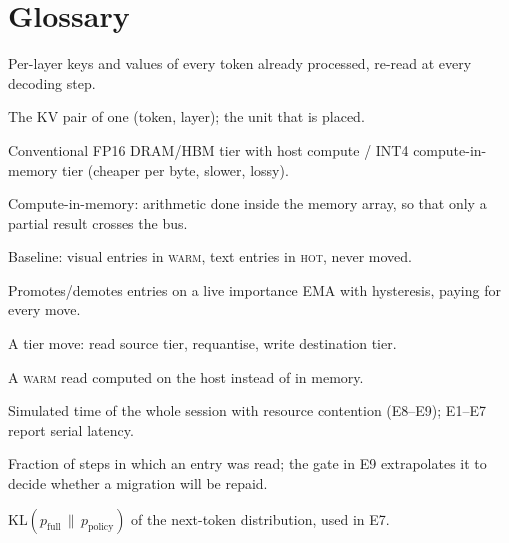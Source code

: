 \documentclass[10pt,a4paper]{article}
\newcommand{\hot}{\textsc{hot}}
\newcommand{\warm}{\textsc{warm}}
\begin{document}
\section{Glossary}
\begin{description}[leftmargin=2.2cm,labelwidth=2cm,itemsep=1pt]
\item[KV cache] Per-layer keys and values of every token already processed, re-read at every decoding step.
\item[Entry] The KV pair of one (token, layer); the unit that is placed.
\item[\hot{} / \warm{}] Conventional FP16 DRAM/HBM tier with host compute / INT4 compute-in-memory tier (cheaper per byte, slower, lossy).
\item[CIM] Compute-in-memory: arithmetic done inside the memory array, so that only a partial result crosses the bus.
\item[Static modality] Baseline: visual entries in \warm{}, text entries in \hot{}, never moved.
\item[Dynamic policy] Promotes/demotes entries on a live importance EMA with hysteresis, paying for every move.
\item[Migration] A tier move: read source tier, requantise, write destination tier.
\item[Spill] A \warm{} read computed on the host instead of in memory.
\item[Makespan] Simulated time of the whole session with resource contention (E8--E9); E1--E7 report serial latency.
\item[Reuse rate] Fraction of steps in which an entry was read; the gate in E9 extrapolates it to decide whether a migration will be repaid.
\item[KL] $\mathrm{KL}(p_{\text{full}}\,\|\,p_{\text{policy}})$ of the next-token distribution, used in E7.
\end{description}
\end{document}
